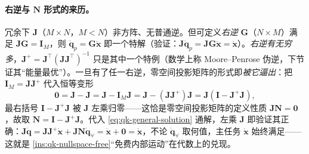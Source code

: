 \paragraph{右逆与 $\mathbf{N}$ 形式的来历。}
冗余下 $\mathbf{J}$（$M\times N$，$M<N$）非方阵、无普通逆。但可定义\emph{右逆} $\mathbf{G}$（$N\times M$）满足 $\mathbf{J}\mathbf{G}=\mathbf{I}_M$，则 $\dot{\boldsymbol{q}}_p=\mathbf{G}\dot{\boldsymbol{x}}$ 即一个特解（验证：$\mathbf{J}\dot{\boldsymbol{q}}_p=\mathbf{J}\mathbf{G}\dot{\boldsymbol{x}}=\dot{\boldsymbol{x}}$）\cite{yu2021quadruped}。\emph{右逆有无穷多}，$\mathbf{J}^{+}=\mathbf{J}^\top(\mathbf{J}\mathbf{J}^\top)^{-1}$ 只是其中一个特例（数学上称 Moore--Penrose 伪逆，下节证其“能量最优”）。一旦有了任一右逆，零空间投影矩阵的形式即\emph{被它逼出}：把 $\mathbf{I}_M=\mathbf{J}\mathbf{J}^{+}$ 代入恒等变形
\begin{equation}
  \mathbf{0}=\mathbf{J}-\mathbf{J}=\mathbf{J}-\mathbf{I}_M\mathbf{J}=\mathbf{J}-(\mathbf{J}\mathbf{J}^{+})\mathbf{J}=\mathbf{J}(\mathbf{I}-\mathbf{J}^{+}\mathbf{J}),
  \label{eq:qk-N-from-rightinv}
\end{equation}
最右括号 $\mathbf{I}-\mathbf{J}^{+}\mathbf{J}$ 被 $\mathbf{J}$ 左乘归零——这恰是零空间投影矩阵的定义性质 $\mathbf{J}\mathbf{N}=\mathbf{0}$，故取 $\mathbf{N}=\mathbf{I}-\mathbf{J}^{+}\mathbf{J}$\cite{yu2021quadruped}。代入 \cref{eq:qk-general-solution} 通解，左乘 $\mathbf{J}$ 即验证其正确：$\mathbf{J}\dot{\boldsymbol{q}}=\mathbf{J}\mathbf{J}^{+}\dot{\boldsymbol{x}}+\mathbf{J}\mathbf{N}\dot{\boldsymbol{q}}_{\forall}=\dot{\boldsymbol{x}}+\mathbf{0}=\dot{\boldsymbol{x}}$，不论 $\dot{\boldsymbol{q}}_{\forall}$ 取何值，主任务 $\dot{\boldsymbol{x}}$ 始终满足——这就是 \cref{ins:qk-nullspace-free}“免费内部运动”在代数上的兑现。

